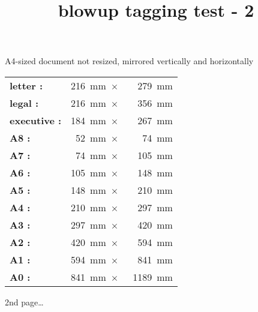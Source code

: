 \documentclass[a4paper,twoside]{article}
\title{blowup tagging test - 2}
\begin{document}
\null\vfill

\huge\centering

A4-sized document not resized, mirrored vertically and horizontally

\vfill

\setlength\extrarowheight{.5ex}
\begin{tabular}{|>{\bfseries}l<{:}r<{\,mm~$\times$~}r<{\,mm}|} \hline
  letter    & 216 &  279 \\
  legal     & 216 &  356 \\
  executive & 184 &  267 \\
  A8        &  52 &   74 \\
  A7        &  74 &  105 \\
  A6        & 105 &  148 \\
  A5        & 148 &  210 \\
  A4        & 210 &  297 \\
  A3        & 297 &  420 \\
  A2        & 420 &  594 \\
  A1        & 594 &  841 \\
  A0        & 841 & 1189 \\ \hline
\end{tabular}

\vfill

\newpage\null 2nd page\dots
\end{document}
